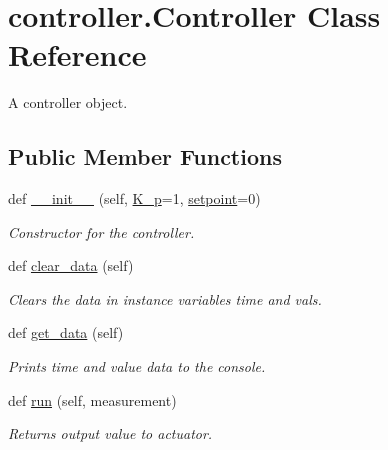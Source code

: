 \hypertarget{classcontroller_1_1_controller}{}\section{controller.\+Controller Class Reference}
\label{classcontroller_1_1_controller}


A controller object.  


\subsection*{Public Member Functions}
\begin{DoxyCompactItemize}
\item 
def \mbox{\hyperlink{classcontroller_1_1_controller_a6a7ea9c3701a0d3fc752bd898c8fb2a3}{\+\_\+\+\_\+init\+\_\+\+\_\+}} (self, \mbox{\hyperlink{classcontroller_1_1_controller_a6147d7f8aa12e56ef01036ddd2b55ee9}{K\+\_\+p}}=1, \mbox{\hyperlink{classcontroller_1_1_controller_ace8a70b35ea15f3f7b6548c64aee1e48}{setpoint}}=0)
\begin{DoxyCompactList}\small\item\em Constructor for the controller. \end{DoxyCompactList}\item 
def \mbox{\hyperlink{classcontroller_1_1_controller_a7e3a8cc2bca705811459c49ec7548f64}{clear\+\_\+data}} (self)
\begin{DoxyCompactList}\small\item\em Clears the data in instance variables time and vals. \end{DoxyCompactList}\item 
def \mbox{\hyperlink{classcontroller_1_1_controller_a035f659090efe04d8db8e9ad30a4d61e}{get\+\_\+data}} (self)
\begin{DoxyCompactList}\small\item\em Prints time and value data to the console. \end{DoxyCompactList}\item 
def \mbox{\hyperlink{classcontroller_1_1_controller_a960dfc22275e951cf58fb9902460cc83}{run}} (self, measurement)
\begin{DoxyCompactList}\small\item\em Returns output value to actuator. \end{DoxyCompactList}\item 
\mbox{\label{classcontroller_1_1_controller_a467766c3be5989bb97d078288b5aee8d}} 

\end{DoxyCompactItemize}
